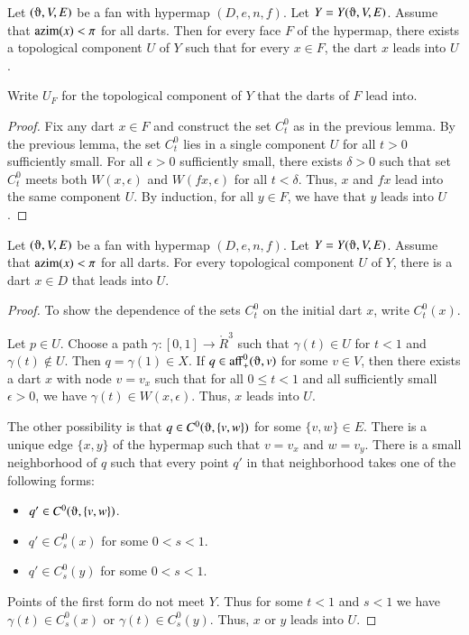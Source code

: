 \begin{lemma} Let $(\orgn,V,E)$ be a fan with hypermap $(D,e,n,f)$. 
Let $Y=Y(\orgn,V,E)$.
Assume that ${\operatorname{azim}}(x)<\pi$
for all darts. Then for every face $F$ of the hypermap, there exists a topological component
$U$ of $Y$ such that for every $x\in F$, the dart $x$ leads into $U$. 
\end{lemma}

Write $U_F$ for the topological component of $Y$ that the darts of $F$ lead into.


\begin{proof}  Fix any dart $x\in F$ and construct the set $C^0_t$ as
in the previous lemma.  By the previous lemma, the set $C^0_t$ lies in a single
component $U$ for all $t>0$ sufficiently small.  For all $\epsilon>0$
sufficiently small, there exists $\delta>0$ such that set $C^0_t$ meets
both $W(x,\epsilon)$ and $W(f x,\epsilon)$ for all $t<\delta$.  Thus,
$x$ and $f x$ lead into the same component $U$.  By induction, for all
$y\in F$, we have that $y$ leads into $U$.
\end{proof}

\begin{lemma} Let $(\orgn,V,E)$ be a fan with hypermap $(D,e,n,f)$. 
Let $Y=Y(\orgn,V,E)$.
Assume that ${\operatorname{azim}}(x)<\pi$
for all darts.  For every topological component $U$ of $Y$, there is a dart
$x\in D$ that leads into $U$.
\end{lemma}

\begin{proof}  
To show the dependence of the sets $C^0_t$ on the initial dart $x$,
write $C^0_t(x)$.

Let $p\in U$.  Choose a path $\gamma:[0,1]\to \ring{R}^3$
such that $\gamma(t)\in U$ for $t<1$ and $\gamma(t)\not\in U$.  Then
$q=\gamma(1)\in X$.  If $q\in\op{aff}^0_+(\orgn,v)$ for some $v\in V$,
then there exists a dart $x$ with node $v = v_x$ such that for 
all $0\le t < 1$ and all sufficiently
small $\epsilon>0$, we have $\gamma(t)\in W(x,\epsilon)$.  Thus,
$x$ leads into $U$.

The other possibility is that
$q\in C^0(\orgn,\{v,w\})$ for some $\{v,w\}\in E$.  There is a unique
edge $\{x,y\}$ of the hypermap such that $v=v_x$ and $w=v_y$.  
There
is a small neighborhood of $q$ such that every point $q'$ in that neighborhood
takes one of the following forms:
\begin{itemize} \item $q'\in C^0(\orgn,\{v,w\})$.
\item $q'\in C^0_s(x)$ for some $0<s<1$.
\item $q'\in C^0_s(y)$ for some $0<s<1$.
\end{itemize}
Points of the first form do not meet $Y$.  Thus for some $t<1$ and $s<1$
we have $\gamma(t)\in C^0_s(x)$ or $\gamma(t)\in C^0_s(y)$.  Thus,
$x$ or $y$ leads into $U$.
\end{proof}

